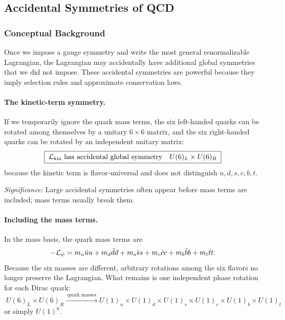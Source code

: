 \documentclass[../main.tex]{subfiles}
\begin{document}
\subsection{Accidental Symmetries of QCD}\label{sec:lec14:accidental-symmetries}

\subsubsection*{Conceptual Background}

Once we impose a gauge symmetry and write the most general renormalizable Lagrangian, the Lagrangian may accidentally have additional global symmetries that we did not impose. These accidental symmetries are powerful because they imply selection rules and approximate conservation laws.

\paragraph{The kinetic-term symmetry.}
If we temporarily ignore the quark mass terms, the six left-handed quarks can be rotated among themselves by a unitary $6\times6$ matrix, and the six right-handed quarks can be rotated by an independent unitary matrix:
\begin{equation}
  \boxed{\;\mathcal{L}_{\mathrm{kin}}\ \text{has accidental global symmetry}\quad
  U(6)_L\times U(6)_R\;}
  \label{eq:lec14:kinetic_accidental_symmetry}
\end{equation}
because the kinetic term is flavor-universal and does not distinguish $u,d,s,c,b,t$.

\textit{Significance:} Large accidental symmetries often appear before mass terms are included; mass terms usually break them.

\paragraph{Including the mass terms.}
In the mass basis, the quark mass terms are
\begin{equation}
  -\mathcal{L}_\psi =
  m_u\bar uu+m_d\bar dd+m_s\bar ss
  +m_c\bar cc+m_b\bar bb+m_t\bar tt .
  \label{eq:lec14:qcd_masses_expanded}
\end{equation}
Because the six masses are different, arbitrary rotations among the six flavors no longer preserve the Lagrangian. What remains is one independent phase rotation for each Dirac quark:
\begin{equation}
  \boxed{\;U(6)_L\times U(6)_R
  \xrightarrow{\ \text{quark masses}\ }
  U(1)_u\times U(1)_d\times U(1)_s\times U(1)_c\times U(1)_b\times U(1)_t\;}
  \label{eq:lec14:u1_six}
\end{equation}
or simply $U(1)^6$.
\end{document}
